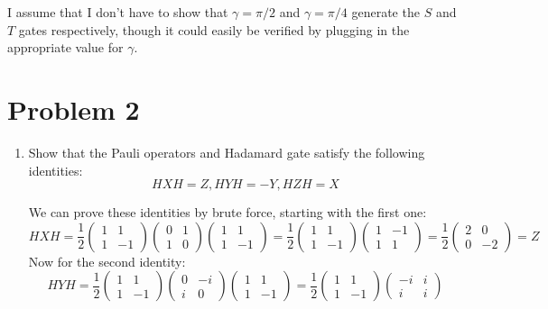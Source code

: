 \documentclass[10pt]{article}
\begin{document}
\begin{enumerate}[label=\alph*)]
\begin{solution}
				 I assume that I don't have to show that \( \gamma = \pi / 2 \) and \( \gamma = \pi / 4 \) 
				 generate the \( S \) and \( T \) gates respectively, though it could easily be 
				 verified by plugging in the appropriate value for \( \gamma \). 
			\end{solution}
	\end{enumerate}
	\pagebreak
	\section*{Problem 2}
	\begin{enumerate}[label=\alph*)]
		\item Show that the Pauli operators and Hadamard gate satisfy the following identities:
			\[
			HXH = Z, HYH = -Y, HZH = X
			\] 
			\begin{solution}
				We can prove these identities by brute force, starting with the first one:
				\[
					HXH = \frac{1}{2}
					\begin{pmatrix} 1 & 1 \\ 1 & -1 \end{pmatrix} \begin{pmatrix} 0 & 1\\ 1 & 0 \end{pmatrix} 
					\begin{pmatrix} 1 & 1 \\ 1 & -1 \end{pmatrix}  =\frac{1}{2} 	
					\begin{pmatrix} 1 & 1 \\ 1 & -1 \end{pmatrix} \begin{pmatrix} 1 & -1\\ 1 & 1 \end{pmatrix} 
					= \frac{1}{2}\begin{pmatrix} 2 & 0\\ 0 & -2 \end{pmatrix} = Z
				\] 
				Now for the second identity:
				\[
				HYH = 	\frac{1}{2}\begin{pmatrix} 1 & 1 \\ 1 & -1 \end{pmatrix} \begin{pmatrix} 0 & -i\\ i & 0 \end{pmatrix} 
					\begin{pmatrix} 1 & 1 \\ 1 & -1 \end{pmatrix}  =
					\frac{1}{2}\begin{pmatrix}  1 & 1 \\ 1 & -1\end{pmatrix} \begin{pmatrix} -i & i\\ i&i \end{pmatrix} 
\]
\end{solution}
\end{enumerate}
\end{document}
